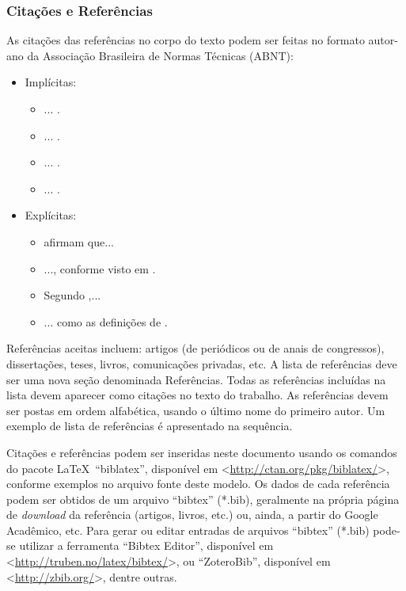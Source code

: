 \documentclass[%
  article,%
  10pt,%
  a4paper,%
  fleqn,%
  oneside,%
  sumario = tradicional,%
  chapter = TITLE,%
  section = TITLE,%
]{abntex2}
\begin{document}
\subsubsection{Citações e Referências}\label{sssec:citref}

As citações das referências no corpo do texto podem ser feitas no formato autor-ano da Associação Brasileira de Normas Técnicas (ABNT):

\begin{itemize}
\item Implícitas:
\begin{itemize}
\item ... \cite{VanEkenstein1997}.
\item ... \cite{Coleman1991,Nriagu1988}.
\item ... \cite{Wizentier1992,Faina2000,Larsson2018}.
\item ... \cite{VanEkenstein1997,Nriagu1988,Faina2000}.
\end{itemize}
\item Explícitas:
\begin{itemize}
\item \textcite{VanEkenstein1997} afirmam que...
\item ..., conforme visto em \textcite{Coleman1991,Nriagu1988}.
\item Segundo \textcite{Wizentier1992,Faina2000,Larsson2018},...
\item ... como as definições de \textcite{VanEkenstein1997,Nriagu1988,Faina2000}.
\end{itemize}
\end{itemize}

Referências aceitas incluem: artigos (de periódicos ou de anais de congressos), dissertações, teses, livros, comunicações privadas, etc. A lista de referências deve ser uma nova seção denominada Referências. Todas as referências incluídas na lista devem aparecer como citações no texto do trabalho. As referências devem ser postas em ordem alfabética, usando o último nome do primeiro autor. Um exemplo de lista de referências é apresentado na sequência.

Citações e referências podem ser inseridas neste documento usando os comandos do pacote \LaTeX\ ``biblatex'', disponível em <\url{http://ctan.org/pkg/biblatex/}>, conforme exemplos no arquivo fonte deste modelo. Os dados de cada referência podem ser obtidos de um arquivo ``bibtex'' (*.bib), geralmente na própria página de \textit{download} da referência (artigos, livros, etc.) ou, ainda, a partir do Google Acadêmico, etc. Para gerar ou editar entradas de arquivos ``bibtex'' (*.bib) pode-se utilizar a ferramenta ``Bibtex Editor'', disponível em <\url{http://truben.no/latex/bibtex/}>, ou ``ZoteroBib'', disponível em <\url{http://zbib.org/}>, dentre outras.
\end{document}
